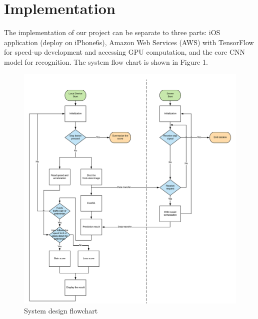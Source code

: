 \documentclass{article}
\begin{document}
\section{Implementation}
The implementation of our project can be separate to three parts: iOS application (deploy on iPhone6s), Amazon Web Services (AWS) with TensorFlow for speed-up development and accessing GPU computation, and the core CNN model for recognition. The system flow chart is shown in Figure 1.
\begin{figure}[ht]
  \centering
  \begin{minipage}{.4\textwidth}
    \centering
    \includegraphics[width=1.2\linewidth]{system_flowchart.png}
    \caption{System design flowchart}
    \label{fig:fig_1}
  \end{minipage}
  \begin{minipage}{.4\textwidth}
    \centering

\end{minipage}
\end{figure}
\end{document}

